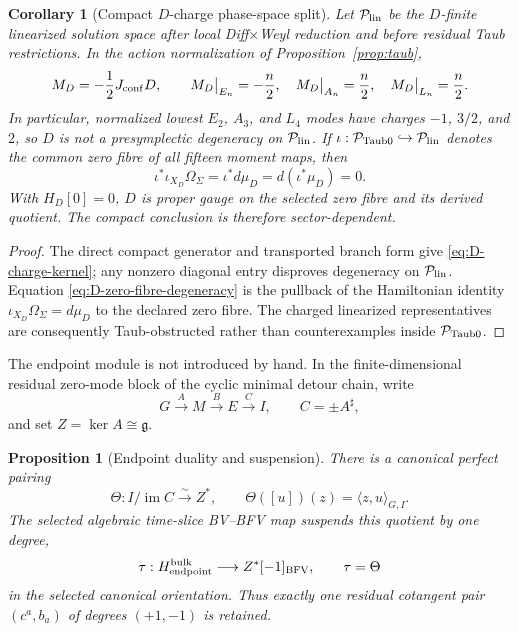 \documentclass[11pt]{article}
\newtheorem{proposition}[theorem]{Proposition}
\newtheorem{corollary}[theorem]{Corollary}
\theoremstyle{remark}
\newcommand{\g}{\mathfrak g}
\newcommand{\im}{\operatorname{im}}
\begin{document}
\begin{corollary}[Compact $D$-charge phase-space split]
\label{cor:D-sector-split}
Let $\mathcal P_{\rm lin}$ be the $D$-finite linearized solution space after
local Diff$\times$Weyl reduction and before residual Taub restrictions.  In
the action normalization of Proposition~\ref{prop:taub},
\begin{equation}\label{eq:D-charge-kernel}
 M_D=-\frac12J_{\rm conf}D,
 \qquad
 M_D\big|_{E_n}=-\frac n2,
 \quad M_D\big|_{A_n}=\frac n2,
 \quad M_D\big|_{L_n}=\frac n2.
\end{equation}
In particular, normalized lowest $E_2$, $A_3$, and $L_4$ modes have charges
$-1$, $3/2$, and $2$, so $D$ is not a presymplectic degeneracy on
$\mathcal P_{\rm lin}$.  If
$\iota:\mathcal P_{\rm Taub0}\hookrightarrow\mathcal P_{\rm lin}$ denotes
the common zero fibre of all fifteen moment maps, then
\begin{equation}\label{eq:D-zero-fibre-degeneracy}
 \iota^*\iota_{X_D}\Omega_\Sigma
 =\iota^*d\mu_D=d(\iota^*\mu_D)=0.
\end{equation}
With $H_D[0]=0$, $D$ is proper gauge on the selected zero fibre and its
derived quotient.  The compact conclusion is therefore sector-dependent.
\end{corollary}

\begin{proof}
The direct compact generator and transported branch form give
\eqref{eq:D-charge-kernel}; any nonzero diagonal entry disproves degeneracy
on $\mathcal P_{\rm lin}$.  Equation
\eqref{eq:D-zero-fibre-degeneracy} is the pullback of the Hamiltonian identity
$\iota_{X_D}\Omega_\Sigma=d\mu_D$ to the declared zero fibre.  The charged
linearized representatives are consequently Taub-obstructed rather than
counterexamples inside $\mathcal P_{\rm Taub0}$.
\end{proof}

The endpoint module is not introduced by hand.  In the finite-dimensional
residual zero-mode block of the cyclic minimal detour chain, write
\begin{equation}\label{eq:detour}
 G\xrightarrow{A}M\xrightarrow{B}E\xrightarrow{C}I,
 \qquad C=\pm A^\sharp,
\end{equation}
and set $Z=\ker A\cong\g$.

\begin{proposition}[Endpoint duality and suspension]\label{prop:endpoint}
There is a canonical perfect pairing
\begin{equation}\label{eq:endpoint}
 \Theta:I/\im C\xrightarrow{\sim}Z^*,
 \qquad \Theta([u])(z)=\langle z,u\rangle_{G,I}.
\end{equation}
The selected algebraic time-slice BV--BFV map suspends this quotient by one
degree,
\begin{equation}\label{eq:suspension}
 \tau:H^{\rm bulk}_{\rm endpoint}\longrightarrow Z^*[-1]_{\rm BFV},
 \qquad \tau=\Theta
\end{equation}
in the selected canonical orientation.  Thus exactly one residual cotangent
pair $(c^a,b_a)$ of degrees $(+1,-1)$ is retained.
\end{proposition}
\end{document}
